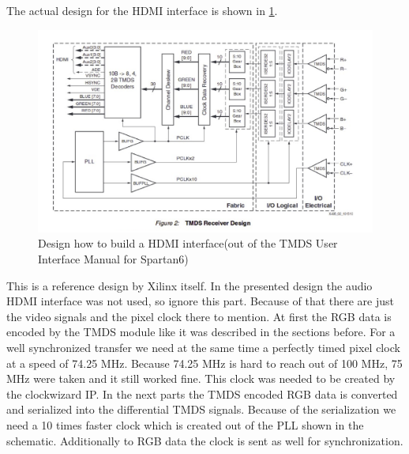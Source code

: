 The actual design for the HDMI interface is shown in \ref{hdmi_design}. 
\begin{figure}[h]
	\centering
	\includegraphics[scale=0.7]{images/hdmi_design.png}

\caption{Design how to build a HDMI interface(out of the TMDS User Interface Manual for Spartan6)}
\label{hdmi_design}
\end{figure}
This is a reference design by Xilinx itself. In the presented design the audio HDMI interface was not used, so ignore this part. Because of that there are just the video signals and the pixel clock there to mention. At first the RGB data is encoded by the TMDS module like it was described in the sections before. For a well synchronized transfer we need at the same time a perfectly timed pixel clock at a speed of 74.25 MHz. Because 74.25 MHz is hard to reach out of 100 MHz, 75 MHz were taken and it still worked fine. This clock was needed to be created by the clockwizard IP. In the next parts the TMDS encoded RGB data is converted and serialized into the differential TMDS signals. Because of the serialization we need a 10 times faster clock which is created out of the PLL shown in the schematic. Additionally to RGB data the clock is sent as well for synchronization.


